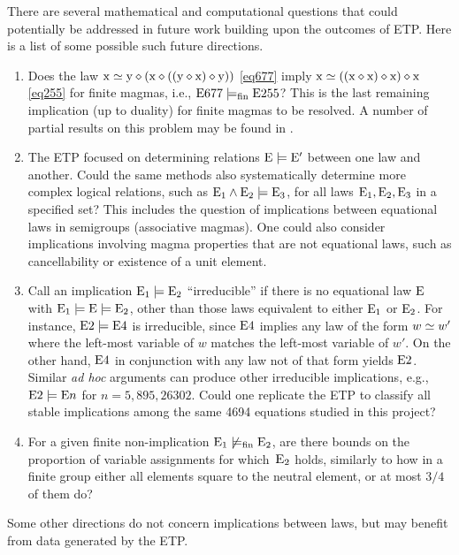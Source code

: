 There are several mathematical and computational questions that could potentially be addressed in future work building upon the outcomes of ETP\@.
Here is a list of some possible such future directions.
\begin{enumerate}
  \item Does the law $\mathrm{x} \simeq \mathrm{y} \diamond (\mathrm{x} \diamond ((\mathrm{y} \diamond \mathrm{x}) \diamond \mathrm{y}))$ \eqref{eq677} imply $\mathrm{x} \simeq ((\mathrm{x} \diamond \mathrm{x}) \diamond \mathrm{x}) \diamond \mathrm{x}$ \eqref{eq255} for finite magmas, i.e., $\mathrm{E}677 \models_{\mathrm{fin}} \mathrm{E}255$? This is the last remaining implication (up to duality) for finite magmas to be resolved.  A number of partial results on this problem may be found in \cite[Chapter~13]{ETP_blueprint}.

  \item The ETP focused on determining relations $\mathrm{E} \models \mathrm{E}'$ between one law and another.  Could the same methods also systematically determine more complex logical relations, such as $\mathrm{E}_1 \wedge \mathrm{E}_2 \models \mathrm{E}_3$, for all laws $\mathrm{E}_1,\mathrm{E}_2,\mathrm{E}_3$ in a specified set?  This includes the question of implications between equational laws in semigroups (associative magmas).  One could also consider implications involving magma properties that are not equational laws, such as cancellability or existence of a unit element.

  \item Call an implication $\mathrm{E}_1 \models \mathrm{E}_2$ ``irreducible'' if there is no equational law $\mathrm{E}$ with $\mathrm{E}_1 \models \mathrm{E} \models \mathrm{E}_2$, other than those laws equivalent to either $\mathrm{E}_1$ or $\mathrm{E}_2$.  For instance, $\mathrm{E}2 \models \mathrm{E}4$ is irreducible, since $\mathrm{E}4$ implies any law of the form $w \simeq w'$ where the left-most variable of $w$ matches the left-most variable of $w'$. On the other hand, $\mathrm{E}4$ in conjunction with any law not of that form yields $\mathrm{E}2$.  Similar \emph{ad hoc} arguments can produce other irreducible implications, e.g., $\mathrm{E}2 \models \mathrm{E}n$ for $n = 5, 895, 26302$.  Could one replicate the ETP to classify all stable implications among the same \num{4694} equations studied in this project?

  \item For a given finite non-implication $\mathrm{E}_1 \not\models_{\mathrm{fin}} \mathrm{E}_2$, are there bounds on the proportion of variable assignments for which~$\mathrm{E}_2$ holds, similarly to how in a finite group either all elements square to the neutral element, or at most $3/4$ of them do?
\end{enumerate}
Some other directions do not concern implications between laws, but may benefit from data generated by the ETP\@.
